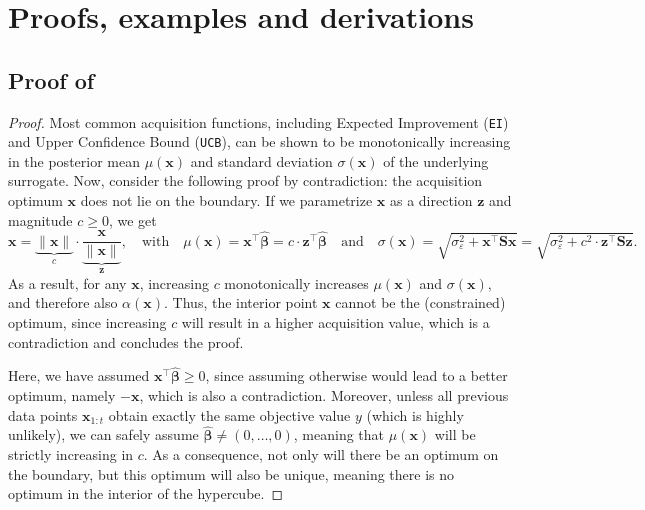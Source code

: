 \documentclass[twoside]{article}
\theoremstyle{plain}
\theoremstyle{definition}
\begin{document}


\newpage

\appendix
\onecolumn
{}

\section{Proofs, examples and derivations} \label{app:proofs}

\subsection{Proof of } \label{app:boundary}
\boundary*
\begin{proof}
    Most common acquisition functions, including Expected Improvement (\texttt{EI}) and Upper Confidence Bound (\texttt{UCB}), can be shown to be monotonically increasing in the posterior mean $\mu(\mathbf{x})$ and standard deviation $\sigma(\mathbf{x})$ of the underlying surrogate. Now, consider the following proof by contradiction: the acquisition optimum $\mathbf{x}$ does not lie on the boundary. If we parametrize $\mathbf{x}$ as a direction $\mathbf{z}$ and magnitude $c \geq 0$, we get
    \begin{equation*}
        \mathbf{x} = \underbrace{\lVert \mathbf{x} \rVert}_c \cdot \underbrace{\dfrac{\mathbf{x}}{\lVert \mathbf{x} \rVert}}_{\mathbf{z}}, \quad \text{with} \quad \mu(\mathbf{x}) = \mathbf{x}^\top \hat{\bm{\beta}} = c \cdot \mathbf{z}^\top \hat{\bm{\beta}} \quad \text{and} \quad \sigma(\mathbf{x}) = \sqrt{\sigma^2_\varepsilon + \mathbf{x}^\top \mathbf{S} \mathbf{x}} = \sqrt{\sigma^2_\varepsilon + c^2 \cdot \mathbf{z}^\top \mathbf{S} \mathbf{z}}.
    \end{equation*}
    As a result, for any $\mathbf{x}$, increasing $c$ monotonically increases $\mu(\mathbf{x})$ and $\sigma(\mathbf{x})$, and therefore also $\alpha(\mathbf{x})$. Thus, the interior point $\mathbf{x}$ cannot be the (constrained) optimum, since increasing $c$ will result in a higher acquisition value, which is a contradiction and concludes the proof. 
    
    Here, we have assumed $\mathbf{x}^\top \hat{\bm{\beta}} \geq 0$, since assuming otherwise would lead to a better optimum, namely $-\mathbf{x}$, which is also a contradiction. Moreover, unless all previous data points $\mathbf{x}_{1:t}$ obtain exactly the same objective value $y$ (which is highly unlikely), we can safely assume $\hat{\bm{\beta}} \neq (0, \ldots, 0)$, meaning that $\mu(\mathbf{x})$ will be strictly increasing in $c$. As a consequence, not only will there be an optimum on the boundary, but this optimum will also be unique, meaning there is no optimum in the interior of the hypercube.


\end{proof}
\end{document}
